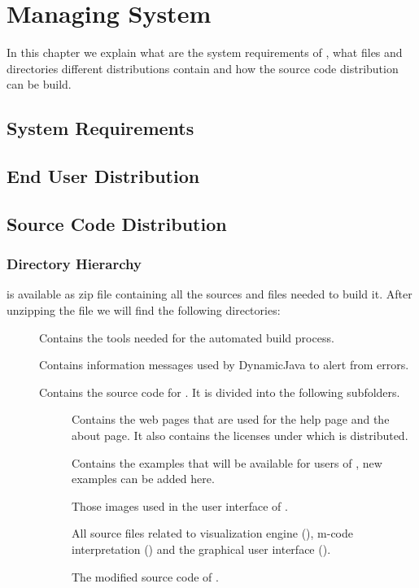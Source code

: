 \section{Managing \jel{} System}
\label{sec:Managing_Jeliot_3_System}

In this chapter we explain what are the system requirements of \jel{},
what files and directories different distributions contain and
how the source code distribution can be build.

\subsection{System Requirements}
\label{sec:System_Requirements}

\subsection{End User Distribution}
\label{sec:End_User_Distribution}

\subsection{Source Code Distribution}
\label{sec:Source_Code_Distribution}

\subsubsection{Directory Hierarchy}

\jel{} is available as zip file containing all the sources
and files needed to build it. After unzipping the file we will
find the following directories:

\begin{description}
\item[] Contains the tools needed for the automated build process.
\item[] Contains information messages used by DynamicJava
to alert from errors.
\item[] Contains the source code for \jel{}. It is divided into
the following subfolders.
\begin{description}
\item[] Contains the web pages that are used for the help page
and the about page. It also contains the licenses under which
\jel{} is distributed.
\item[] Contains the examples that will be available for users
of \jel{}, new examples can be added here.
\item[] Those images used in the user interface of \jel{}.
\item[] All source files related to \jel{} visualization engine (),
m-code interpretation () and the graphical user interface ().
\item[] The modified source code of \djava{}.
\end{description}
\end{description}

